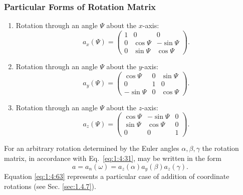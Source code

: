 \subsubsection{Particular Forms of Rotation Matrix}
\begin{enumerate}[label=(\alph*)]
  \item 
 Rotation through an angle \(\Psi\) about the \(x\)-axis:
\begin{equation}
a_{x}(\Psi)=\begin{pmatrix}
1 & 0 & 0  \label{eq:1:4:60}\\
0 & \cos \Psi & -\sin \Psi \\
0 & \sin \Psi & \cos \Psi
\end{pmatrix} .
\end{equation}
\item Rotation through an angle \(\Psi\) about the \(y\)-axis:
\begin{equation}
a_{y}(\Psi)=\begin{pmatrix}
\cos \Psi & 0 & \sin \Psi  \label{eq:1:4:61}\\
0 & 1 & 0 \\
-\sin \Psi & 0 & \cos \Psi
\end{pmatrix} .
\end{equation}
\item Rotation through an angle \(\Psi\) about the \(z\)-axis:
\begin{equation}
a_{z}(\Psi)=\begin{pmatrix}
\cos \Psi & -\sin \Psi & 0  \label{eq:1:4:62}\\
\sin \Psi & \cos \Psi & 0 \\
0 & 0 & 1
\end{pmatrix}.
\end{equation}
\end{enumerate}

For an arbitrary rotation determined by the Euler angles \(\alpha, \beta, \gamma\) the rotation matrix, in accordance with Eq.~\eqref{eq:1:4:31}, may be written in the form
\begin{equation}
a=a_{n}(\omega)=a_{z}(\alpha) a_{y}(\beta) a_{z}(\gamma). \label{eq:1:4:63}
\end{equation}
Equation \eqref{eq:1:4:63} represents a particular case of addition of coordinate rotations (see Sec. \ref{sec:1.4.7}).
